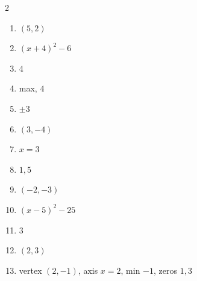 \documentclass[11pt]{article}
\begin{document}
\begin{keybox}
\begin{multicols}{2}
\small
\begin{enumerate}[leftmargin=*,itemsep=3pt]
  \item $(5,2)$
  \item $(x+4)^2-6$
  \item $4$
  \item max, $4$
  \item $\pm3$
  \item $(3,-4)$
  \item $x=3$
  \item $1,5$
  \item $(-2,-3)$
  \item $(x-5)^2-25$
  \item $3$
  \item $(2,3)$
  \item vertex $(2,-1)$, axis $x=2$, min $-1$, zeros $1,3$
\end{enumerate}
\end{multicols}
\end{keybox}
\end{document}
